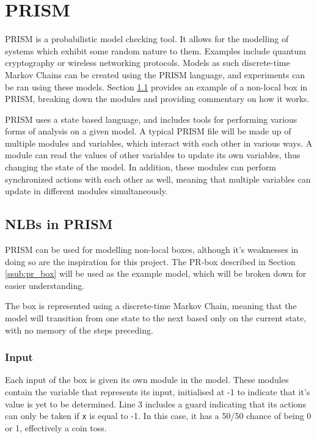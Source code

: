 \documentclass[report.tex]{subfiles}
\begin{document}
\newpage
\section{PRISM} %
\label{sec:prism}
PRISM \cite{KNP11} is a probabilistic model checking tool. It allows for
the modelling of systems which exhibit some random nature to them. Examples
include quantum cryptography or wireless networking protocols. Models as such
discrete-time Markov Chains can be created using the PRISM language, and
experiments can be ran using these models. Section \ref{sub:nlbs_in_prism}
provides an example of a non-local box in PRISM, breaking down the modules and
providing commentary on how it works.

PRISM uses a state based language, and includes tools for performing various
forms of analysis on a given model. A typical PRISM file will be made up of
multiple modules and variables, which interact with each other in various ways.
A module can read the values of other variables to update its own variables,
thus changing the state of the model. In addition, these modules can perform
synchronized actions with each other as well, meaning that multiple variables
can update in different modules simultaneously.

\subsection{NLBs in PRISM} %
\label{sub:nlbs_in_prism}
PRISM can be used for modelling non-local boxes, although it's weaknesses in 
doing so are the inspiration for this project. The PR-box described in
Section \ref{ssub:pr_box} will be used as the example model, which will be
broken down for easier understanding.

The box is represented using a discrete-time Markov Chain, meaning that the 
model will transition from one state to the next based only on the current
state, with no memory of the steps preceding.

\subsubsection{Input} %
\label{ssub:input}
 

Each input of the box is given its own module in the model. These modules
contain the variable that represents its input, initialised at -1 to indicate
that it's value is yet to be determined. Line 3 includes a guard indicating that
its actions can only be taken if \texttt{x} is equal to -1. In this case, it has
a 50/50 chance of being 0 or 1, effectively a coin toss.
\end{document}

